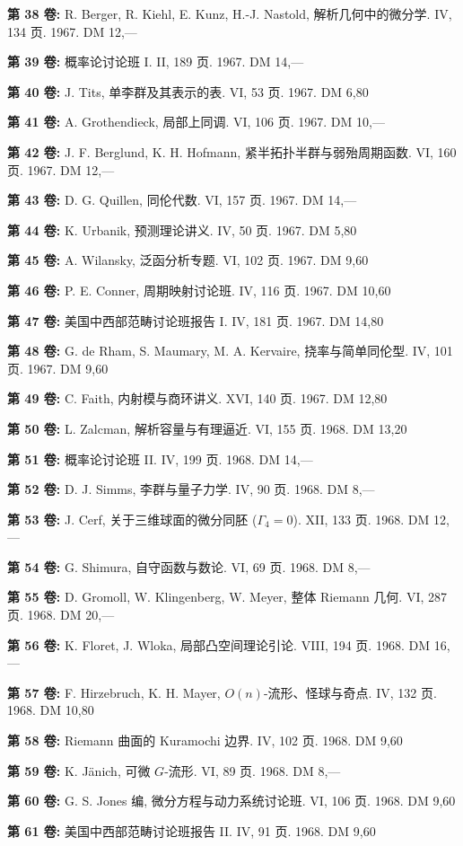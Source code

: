 \clearpage
\begingroup
\sffamily\fontsize{8}{10.5}\selectfont
\setlength{\parindent}{0pt}\setlength{\parskip}{3pt}
\setlength{\columnsep}{6mm}
\providecommand{\sgaCatalogEntry}[6]{\noindent\textbf{第 #1 卷:} #2#3. #4 页. #5. DM #6\par}
\sgaCatalogEntry{38}{R. Berger, R. Kiehl, E. Kunz, H.-J. Nastold, }{解析几何中的微分学}{IV, 134}{1967}{12,—}
\sgaCatalogEntry{39}{}{概率论讨论班 I}{II, 189}{1967}{14,—}
\sgaCatalogEntry{40}{J. Tits, }{单李群及其表示的表}{VI, 53}{1967}{6,80}
\sgaCatalogEntry{41}{A. Grothendieck, }{局部上同调}{VI, 106}{1967}{10,—}
\sgaCatalogEntry{42}{J. F. Berglund, K. H. Hofmann, }{紧半拓扑半群与弱殆周期函数}{VI, 160}{1967}{12,—}
\sgaCatalogEntry{43}{D. G. Quillen, }{同伦代数}{VI, 157}{1967}{14,—}
\sgaCatalogEntry{44}{K. Urbanik, }{预测理论讲义}{IV, 50}{1967}{5,80}
\sgaCatalogEntry{45}{A. Wilansky, }{泛函分析专题}{VI, 102}{1967}{9,60}
\sgaCatalogEntry{46}{P. E. Conner, }{周期映射讨论班}{IV, 116}{1967}{10,60}
\sgaCatalogEntry{47}{}{美国中西部范畴讨论班报告 I}{IV, 181}{1967}{14,80}
\sgaCatalogEntry{48}{G. de Rham, S. Maumary, M. A. Kervaire, }{挠率与简单同伦型}{IV, 101}{1967}{9,60}
\sgaCatalogEntry{49}{C. Faith, }{内射模与商环讲义}{XVI, 140}{1967}{12,80}
\sgaCatalogEntry{50}{L. Zalcman, }{解析容量与有理逼近}{VI, 155}{1968}{13,20}
\sgaCatalogEntry{51}{}{概率论讨论班 II}{IV, 199}{1968}{14,—}
\sgaCatalogEntry{52}{D. J. Simms, }{李群与量子力学}{IV, 90}{1968}{8,—}
\sgaCatalogEntry{53}{J. Cerf, }{关于三维球面的微分同胚 ($\Gamma_4=0$)}{XII, 133}{1968}{12,—}
\sgaCatalogEntry{54}{G. Shimura, }{自守函数与数论}{VI, 69}{1968}{8,—}
\sgaCatalogEntry{55}{D. Gromoll, W. Klingenberg, W. Meyer, }{整体 Riemann 几何}{VI, 287}{1968}{20,—}
\sgaCatalogEntry{56}{K. Floret, J. Wloka, }{局部凸空间理论引论}{VIII, 194}{1968}{16,—}
\sgaCatalogEntry{57}{F. Hirzebruch, K. H. Mayer, }{$O(n)$-流形、怪球与奇点}{IV, 132}{1968}{10,80}
\sgaCatalogEntry{58}{}{Riemann 曲面的 Kuramochi 边界}{IV, 102}{1968}{9,60}
\sgaCatalogEntry{59}{K. Jänich, }{可微 $G$-流形}{VI, 89}{1968}{8,—}
\sgaCatalogEntry{60}{G. S. Jones 编, }{微分方程与动力系统讨论班}{VI, 106}{1968}{9,60}
\sgaCatalogEntry{61}{}{美国中西部范畴讨论班报告 II}{IV, 91}{1968}{9,60}
